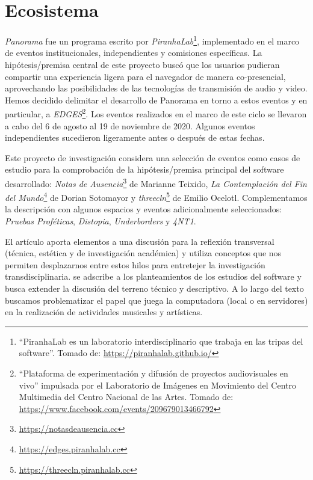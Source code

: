 
\section*{Ecosistema}


\textit{Panorama} \citep{panorama} fue un programa escrito por \textit{PiranhaLab}\footnote{``PiranhaLab es un laboratorio interdisciplinario que trabaja en las tripas del software''. Tomado de: \url{https://piranhalab.github.io/}}, implementado en el marco de eventos institucionales, independientes y comisiones específicas. La hipótesis/premisa central de este proyecto buscó que los usuarios pudieran compartir una experiencia ligera para el navegador de manera co-presencial, aprovechando las posibilidades de las tecnologías de transmisión de audio y video. %
Hemos decidido delimitar el desarrollo de Panorama en torno a estos eventos y en particular, a \textit{EDGES}\footnote{ ``Plataforma de experimentación y difusión de proyectos audiovisuales en vivo'' impulsada por el Laboratorio de Imágenes en Movimiento del Centro Multimedia del Centro Nacional de las Artes. Tomado de: \url{https://www.facebook.com/events/209679013466792}}. Los eventos realizados en el marco de este ciclo se llevaron a cabo del 6 de agosto al 19 de noviembre de 2020. Algunos eventos independientes sucedieron ligeramente antes o después de estas fechas. 	

Este proyecto de investigación considera una selección de eventos como casos de estudio para la comprobación de la hipótesis/premisa principal del software desarrollado: \textit{Notas de Ausencia}\footnote{\url{https://notasdeausencia.cc}} de Marianne Teixido, \textit{La Contemplación del Fin del Mundo}\footnote{\url{https://edges.piranhalab.cc}} de Dorian Sotomayor y \textit{threecln}\footnote{\url{https://threecln.piranhalab.cc}} de Emilio Ocelotl. Complementamos la descripción con algunos espacios y eventos adicionalmente seleccionados: \textit{Pruebas Proféticas}, \textit{Distopia}, \textit{Underborders} y \textit{4NT1}. %

El artículo aporta elementos a una discusión para la reflexión transversal (técnica, estética y  de investigación académica) y utiliza conceptos que nos permiten desplazarnos entre estos hilos para entretejer la investigación transdisciplinaria. se adscribe a los planteamientos de los estudios del software y busca extender la discusión del terreno técnico y descriptivo. A lo largo del texto buscamos problematizar el papel que juega la computadora (local o en servidores) en la realización de actividades musicales y artísticas.



